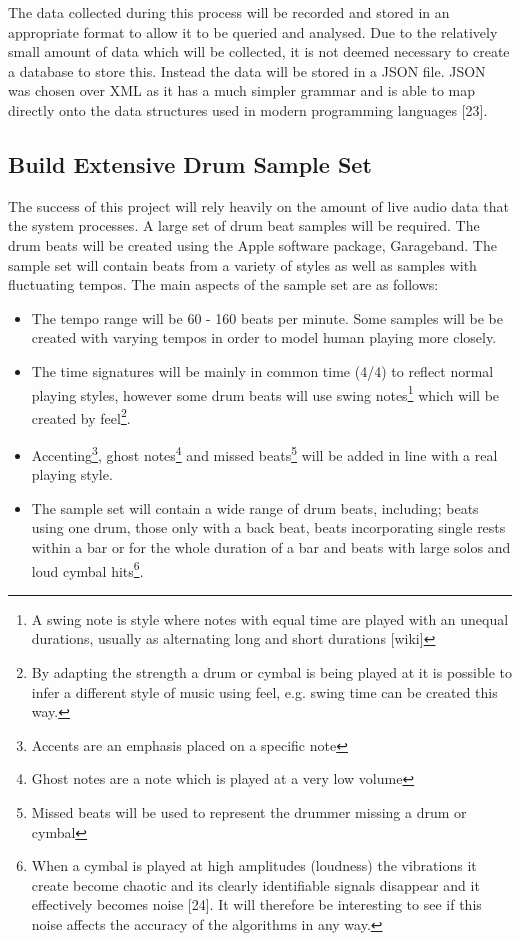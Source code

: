 \documentclass[a4paper, 11pt]{article}
\begin{document}
The data collected during this process will be recorded and stored in an appropriate format to allow it to be queried and analysed. Due to the relatively small amount of data which will be collected, it is not deemed necessary to create a database to store this. Instead the data will be stored in a JSON file. JSON was chosen over XML as it has a much simpler grammar and is able to map directly onto the data structures used in modern programming languages [23].

\subsection{Build Extensive Drum Sample Set}
The success of this project will rely heavily on the amount of live audio data that the system processes. A large set of drum beat samples will be required. The drum beats will be created using the Apple software package, Garageband. The sample set will contain beats from a variety of styles as well as samples with fluctuating tempos. The main aspects of the sample set are as follows:

\begin{itemize}
\item The tempo range will be 60 - 160 beats per minute. Some samples will be be created with varying tempos in order to model human playing more closely.
\item The time signatures will be mainly in common time (4/4) to reflect normal playing styles, however some drum beats will use swing notes\footnote{A swing note is style where notes with equal time are played with an unequal durations, usually as alternating long and short durations [wiki]} which will be created by feel\footnote{By adapting the strength a drum or cymbal is being played at it is possible to infer a different style of music using feel, e.g. swing time can be created this way.}.
\item Accenting\footnote{Accents are an emphasis placed on a specific note}, ghost notes\footnote{Ghost notes are a note which is played at a very low volume} and missed beats\footnote{Missed beats will be used to represent the drummer missing a drum or cymbal} will be added in line with a real playing style.
\item The sample set will contain a wide range of drum beats, including; beats using one drum, those only with a back beat, beats incorporating single rests within a bar or for the whole duration of a bar and beats with large solos and loud cymbal hits\footnote{When a cymbal is played at high amplitudes (loudness) the vibrations it create become chaotic and its clearly identifiable signals disappear and it effectively becomes noise [24]. It will therefore be interesting to see if this noise affects the accuracy of the algorithms in any way.}.
\end{itemize} 
\end{document}
